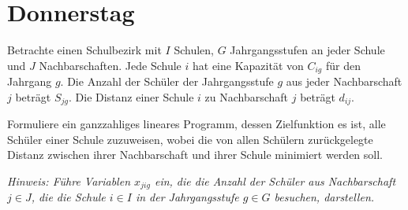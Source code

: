 \documentclass{uebung_cs}
\begin{document}
\section*{Donnerstag}


\begin{exercise}
	Betrachte einen Schulbezirk mit $I$ Schulen, $G$ Jahrgangsstufen an jeder Schule und $J$ Nachbarschaften. Jede Schule $i$ hat eine Kapazität von $C_{ig}$ für den Jahrgang $g$. Die Anzahl der Schüler der Jahrgangsstufe $g$ aus jeder Nachbarschaft $j$ beträgt $S_{jg}$. Die Distanz einer Schule $i$ zu Nachbarschaft $j$ beträgt $d_{ij}$.
	
	Formuliere ein ganzzahliges lineares Programm, dessen Zielfunktion es ist, alle Schüler einer Schule zuzuweisen, wobei die von allen Schülern zurückgelegte Distanz zwischen ihrer Nachbarschaft und ihrer Schule minimiert werden soll.

	\emph{Hinweis: Führe Variablen $x_{jig}$ ein, die die Anzahl der Schüler aus Nachbarschaft $j \in J$, die die Schule $i \in I$ in der Jahrgangsstufe $g \in G$ besuchen, darstellen.}
\end{exercise}
\end{document}
